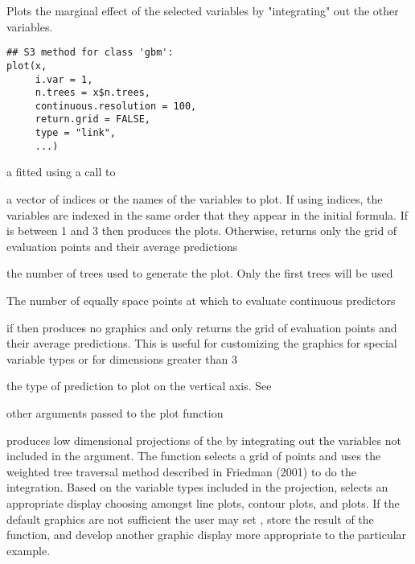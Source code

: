 \begin{Description}\relax
Plots the marginal effect of the selected variables by "integrating" out the other variables.
\end{Description}
\begin{Usage}
\begin{verbatim}
## S3 method for class 'gbm':
plot(x,
     i.var = 1,
     n.trees = x$n.trees,
     continuous.resolution = 100,
     return.grid = FALSE,
     type = "link",
     ...)
\end{verbatim}
\end{Usage}
\begin{Arguments}
\begin{ldescription}
\item[\code{x}] a  fitted using a call to 
\item[\code{i.var}] a vector of indices or the names of the variables to plot. If
using indices, the variables are indexed in the same order that they appear
in the initial  formula.
If  is between 1 and 3 then  produces the plots. Otherwise,
 returns only the grid of evaluation points and their average predictions
\item[\code{n.trees}] the number of trees used to generate the plot. Only the first
 trees will be used
\item[\code{continuous.resolution}] The number of equally space points at which to
evaluate continuous predictors 
\item[\code{return.grid}] if  then  produces no graphics and only returns
the grid of evaluation points and their average predictions. This is useful for
customizing the graphics for special variable types or for dimensions greater
than 3 
\item[\code{type}] the type of prediction to plot on the vertical axis. See
\item[\code{...}] other arguments passed to the plot function 
\end{ldescription}
\end{Arguments}
\begin{Details}\relax
{} produces low dimensional projections of the
 by integrating out the variables not included in the
 argument. The function selects a grid of points and uses the
weighted tree traversal method described in Friedman (2001) to do the
integration. Based on the variable types included in the projection,
 selects an appropriate display choosing amongst line plots,
contour plots, and  plots. If the default graphics
are not sufficient the user may set , store the result
of the function, and develop another graphic display more appropriate to the
particular example.
\end{Details}
